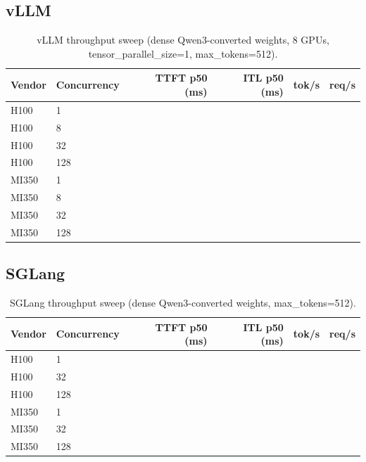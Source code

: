 \subsection{vLLM}
\label{sec:inference:vllm}

\begin{table}[h]
\centering
\caption{vLLM throughput sweep (dense Qwen3-converted weights, 8 GPUs,
tensor\_parallel\_size=1, max\_tokens=512).}
\label{tab:vllm}
\small
\begin{tabular}{llrrrr}
\toprule
\textbf{Vendor} & \textbf{Concurrency} &
\textbf{TTFT p50 (ms)} & \textbf{ITL p50 (ms)} &
\textbf{tok/s} & \textbf{req/s} \\
\midrule
H100  & 1   & \PH{} & \PH{} & \PH{} & \PH{} \\
H100  & 8   & \PH{} & \PH{} & \PH{} & \PH{} \\
H100  & 32  & \PH{} & \PH{} & \PH{} & \PH{} \\
H100  & 128 & \PH{} & \PH{} & \PH{} & \PH{} \\
\midrule
MI350 & 1   & \PH{} & \PH{} & \PH{} & \PH{} \\
MI350 & 8   & \PH{} & \PH{} & \PH{} & \PH{} \\
MI350 & 32  & \PH{} & \PH{} & \PH{} & \PH{} \\
MI350 & 128 & \PH{} & \PH{} & \PH{} & \PH{} \\
\bottomrule
\end{tabular}
\end{table}

\subsection{SGLang}
\label{sec:inference:sglang}

\begin{table}[h]
\centering
\caption{SGLang throughput sweep (dense Qwen3-converted weights, max\_tokens=512).}
\label{tab:sglang}
\small
\begin{tabular}{llrrrr}
\toprule
\textbf{Vendor} & \textbf{Concurrency} &
\textbf{TTFT p50 (ms)} & \textbf{ITL p50 (ms)} &
\textbf{tok/s} & \textbf{req/s} \\
\midrule
H100  & 1   & \PH{} & \PH{} & \PH{} & \PH{} \\
H100  & 32  & \PH{} & \PH{} & \PH{} & \PH{} \\
H100  & 128 & \PH{} & \PH{} & \PH{} & \PH{} \\
\midrule
MI350 & 1   & \PH{} & \PH{} & \PH{} & \PH{} \\
MI350 & 32  & \PH{} & \PH{} & \PH{} & \PH{} \\
MI350 & 128 & \PH{} & \PH{} & \PH{} & \PH{} \\
\bottomrule
\end{tabular}
\end{table}

